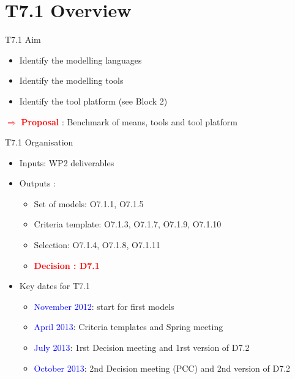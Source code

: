 
\section{T7.1 Overview}

\begin{frame}{T7.1 Aim}

  \begin{itemize}
  \item
    Identify the modelling languages
  \item
    Identify the modelling tools
  \item 
  	Identify the tool platform (see Block 2)
  \end{itemize}
  
  \textcolor{red}{$ \Rightarrow $ \bf{Proposal} } :
   Benchmark of means, tools and tool platform

\end{frame}


\begin{frame}{T7.1 Organisation}

  \begin{itemize}
  \item
    Inputs: WP2 deliverables
  \item
    Outputs :
      \begin{itemize}
      \item
      	Set of models: O7.1.1, O7.1.5
	  \item
	    Criteria template: O7.1.3, O7.1.7, O7.1.9, O7.1.10
	  \item
	    Selection: O7.1.4, O7.1.8, O7.1.11
	  \item
	  	\textcolor{red}{\textbf{Decision : D7.1}}
  \end{itemize}
  \pause
  	\item
  		Key dates for T7.1
  	 \begin{itemize}
	  \item
 	   \textcolor{blue}{November 2012}: start for first models
 	  \item
 	   \textcolor{blue}{April 2013}: Criteria templates and Spring meeting
 	  \item
 	   \textcolor{blue}{July 2013}: 1rst Decision meeting and 1rst version of D7.2
 	  \item
 	   \textcolor{blue}{October 2013}: 2nd Decision meeting (PCC) and 2nd version of D7.2
 	  \end{itemize}	
  
  \end{itemize}

\end{frame}


